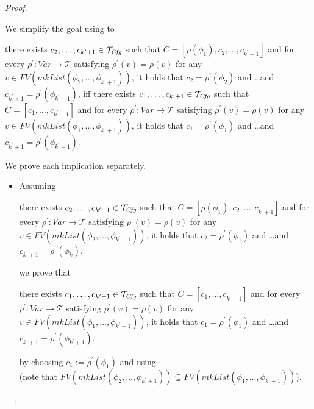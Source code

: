 \begin{proof}
\begin{itemize}
    We simplify the goal using  to
    \begin{proofenv}
    there exists $c_2, \ldots, c_{k^\prime + 1} \in \mathcal{T}_{\mathit{Cfg}}$ such that
    $C = [\rho(\phi_1), c_2, \ldots, c_{k^\prime+1}]$
    and for every $\rho^\prime : \mathit{Var} \to \mathcal{T}$ satisfying
    $\rho^\prime(v) = \rho(v)$ for any
    $v \in \mathit{FV}(\mathit{mkList}(\phi_2, \ldots, \phi_{k^\prime+1}))$,
    it holds that
    $c_2 = \rho^\prime(\phi_2)$ and \ldots and $c_{k^\prime+1} = \rho^\prime(\phi_{k^\prime+1})$,
    iff there exists $c_1, \ldots, c_{k^\prime + 1} \in \mathcal{T}_{\mathit{Cfg}}$ such that $C = [c_1, \ldots, c_{k^\prime + 1}]$
    and for every $\rho^\prime : \mathit{Var} \to \mathcal{T}$ satisfying
    $\rho^\prime(v) = \rho(v)$ for any
    $v \in \mathit{FV}(\mathit{mkList}(\phi_1, \ldots, \phi_{k^\prime + 1}))$,
    it holds that
    $c_1 = \rho^\prime(\phi_1)$ and \ldots and $c_{k^\prime + 1} = \rho^\prime(\phi_{k^\prime + 1})$.
    \end{proofenv}
    We prove each implication separately.
    \begin{itemize}
        \item Assuming
        \begin{proofenv}
        there exists $c_2, \ldots, c_{k^\prime + 1} \in \mathcal{T}_{\mathit{Cfg}}$ such that
        $C = [\rho(\phi_1), c_2, \ldots, c_{k^\prime+1}]$
        and for every $\rho^\prime : \mathit{Var} \to \mathcal{T}$ satisfying
        $\rho^\prime(v) = \rho(v)$ for any
        $v \in \mathit{FV}(\mathit{mkList}(\phi_2, \ldots, \phi_{k^\prime+1}))$,
        it holds that
        $c_2 = \rho^\prime(\phi_1)$ and \ldots and $c_{k^\prime+1} = \rho^\prime(\phi_k)$,
        \end{proofenv}
        we prove that
        \begin{proofenv}
        there exists $c_1, \ldots, c_{k^\prime + 1} \in \mathcal{T}_{\mathit{Cfg}}$ such that $C = [c_1, \ldots, c_{k^\prime + 1}]$
        and for every $\rho^\prime : \mathit{Var} \to \mathcal{T}$ satisfying
        $\rho^\prime(v) = \rho(v)$ for any
        $v \in \mathit{FV}(\mathit{mkList}(\phi_1, \ldots, \phi_{k^\prime + 1}))$,
        it holds that
        $c_1 = \rho^\prime(\phi_1)$ and \ldots and $c_{k^\prime + 1} = \rho^\prime(\phi_{k^\prime + 1})$.
        \end{proofenv}
        by choosing $c_1 := \rho^\prime(\phi_1)$ and using \\
        (note that $\mathit{FV}(\mathit{mkList}(\phi_2,\ldots,\phi_{k^\prime+1})) \subseteq \mathit{FV}(\mathit{mkList}(\phi_1,\ldots,\phi_{k^\prime+1}))$).

\end{itemize}
\end{itemize}
\end{proof}
